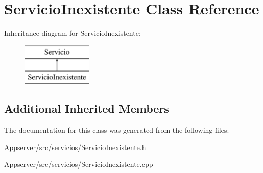 \hypertarget{classServicioInexistente}{}\section{Servicio\+Inexistente Class Reference}
\label{classServicioInexistente}
Inheritance diagram for Servicio\+Inexistente\+:\begin{figure}[H]
\begin{center}
\leavevmode
\includegraphics[height=2.000000cm]{classServicioInexistente}
\end{center}
\end{figure}
\subsection*{Additional Inherited Members}


The documentation for this class was generated from the following files\+:\begin{DoxyCompactItemize}
\item 
Appserver/src/servicios/Servicio\+Inexistente.\+h\item 
Appserver/src/servicios/Servicio\+Inexistente.\+cpp\end{DoxyCompactItemize}
